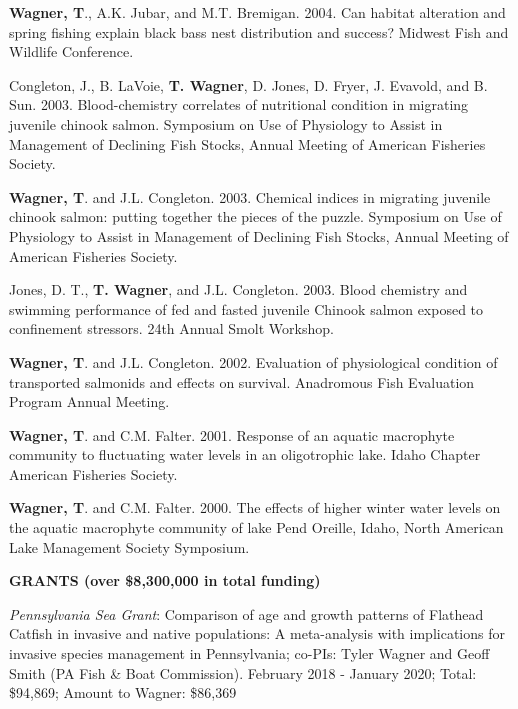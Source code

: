 \documentclass[10pt]{article}
\begin{document}
\begin{flushleft}
\begin{etaremune}
\item {\bf Wagner, T}., A.K. Jubar, and M.T. Bremigan. 2004. Can habitat alteration and spring fishing explain black bass nest distribution and success? Midwest Fish and Wildlife Conference.


\item Congleton, J., B. LaVoie, {\bf T. Wagner}, D. Jones, D. Fryer, J. Evavold, and B. Sun. 2003. Blood-chemistry correlates of nutritional condition in migrating juvenile chinook salmon. Symposium on Use of Physiology to Assist in Management of Declining Fish Stocks, Annual Meeting of American Fisheries Society.

\item {\bf Wagner, T}. and J.L. Congleton. 2003. Chemical indices in migrating juvenile chinook salmon: putting together the pieces of the puzzle. Symposium on Use of Physiology to Assist in Management of Declining Fish Stocks, Annual Meeting of American Fisheries Society.

\item Jones, D. T., {\bf T. Wagner}, and J.L. Congleton. 2003. Blood chemistry and swimming performance of fed and fasted juvenile Chinook salmon exposed to confinement stressors. 24th Annual Smolt Workshop.


\item {\bf Wagner, T}. and J.L. Congleton. 2002. Evaluation of physiological condition of transported salmonids and effects on survival. Anadromous Fish Evaluation Program Annual Meeting.


\item {\bf Wagner, T}. and C.M. Falter. 2001. Response of an aquatic macrophyte community to fluctuating water levels in an oligotrophic lake. Idaho Chapter American Fisheries Society.


\item {\bf Wagner, T}. and C.M. Falter. 2000. The effects of higher winter water levels on the aquatic macrophyte community of lake Pend Oreille, Idaho, North American Lake Management Society Symposium.


\end{etaremune}

\centerline {\bf{GRANTS (over \$8,300,000 in total funding)}}
\vspace{5pt}
\begin{etaremune}
\item {\sl Pennsylvania Sea Grant}: Comparison of age and growth patterns of Flathead Catfish in invasive and native populations: A meta-analysis with implications for invasive species management in Pennsylvania; co-PIs: Tyler Wagner and Geoff Smith (PA Fish \& Boat Commission). February 2018 - January 2020; Total: \$94,869;  Amount to Wagner: \$86,369


\end{etaremune}
\end{flushleft}
\end{document}

